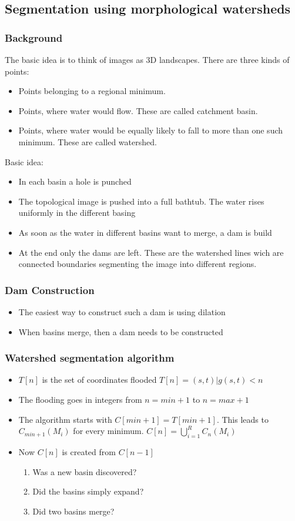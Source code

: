 \subsection{Segmentation using morphological watersheds}
\subsubsection{Background}
The basic idea is to think of images as 3D landscapes. There are three kinds of points:
\begin{itemize}
\item Points belonging to a regional minimum.
\item Points, where water would flow. These are called catchment basin.
\item Points, where water would be equally likely to fall to more than one such minimum. These are called watershed.
\end{itemize}
Basic idea:
\begin{itemize}
\item In each basin a hole is punched
\item The topological image is pushed into a full bathtub. The water rises uniformly in the different basing
\item As soon as the water in different basins want to merge, a dam is build
\item At the end only the dams are left. These are the watershed lines wich are connected boundaries segmenting the image into different regions.
\end{itemize}
\subsubsection{Dam Construction}
\begin{itemize}
\item The easiest way to construct such a dam is using dilation
\item When basins merge, then a dam needs to be constructed
\end{itemize}
\subsubsection{Watershed segmentation algorithm}
\begin{itemize}
\item $T[n]$ is the set of coordinates flooded $T[n] = {(s,t)|g(s,t)<n}$
\item The flooding goes in integers from $n=min+1$ to $n=max+1$
\item The algorithm starts with $C[min+1]=T[min+1]$. This leads to $C_{min+1}(M_i)$ for every minimum. $C[n]=\bigcup\limits_{i=1}^{R}C_n(M_i)$
\item Now $C[n]$ is created from $C[n-1]$
\begin{enumerate}
\item Was a new basin discovered?
\item Did the basins simply expand?
\item Did two basins merge?
\end{enumerate}
\end{itemize}
